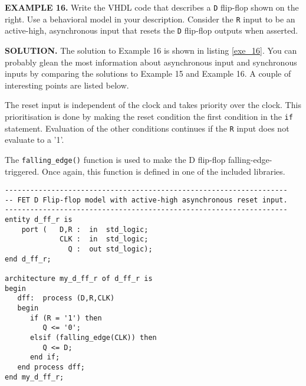 \begin{leftbar}
\begin{minipage}{0.5\linewidth}
\noindent
\textbf{EXAMPLE 16.}
Write the VHDL code that describes a \texttt{D} flip-flop shown on the right. Use a behavioral model in your description. Consider the \texttt{R} input to be an active-high, asynchronous input that resets the \texttt{D} flip-flop outputs when asserted.
\end{minipage}
\begin{minipage}{0.47\linewidth}
\begin{flushright}
\end{flushright}
\end{minipage}
\end{leftbar}
\noindent
\textbf{SOLUTION.} The solution to Example 16 is shown in listing \ref{exe_16}. You can probably glean the most information about asynchronous input and synchronous inputs by comparing the solutions to Example 15 and Example 16. A couple of interesting points are listed below. 
\begin{my_list}
\item The reset input is independent of the clock and takes priority over the clock. This prioritisation is done by making the reset condition the first condition in the \texttt{if} statement. Evaluation of the other conditions continues if the \texttt{R} input does not evaluate to a '1'.
\item The \texttt{falling\_edge()} function is used to make the D flip-flop falling-edge-triggered. Once again, this function is defined in one of the included libraries. 
\end{my_list}
\begin{lstlisting}[label=exe_16, caption=Solution to Example 16.]
-------------------------------------------------------------------
-- FET D Flip-flop model with active-high asynchronous reset input.
-------------------------------------------------------------------
entity d_ff_r is 
    port (   D,R :  in  std_logic; 
             CLK :  in  std_logic; 
               Q :  out std_logic); 
end d_ff_r;

architecture my_d_ff_r of d_ff_r is 
begin
   dff:  process (D,R,CLK)
   begin
      if (R = '1') then 
         Q <= '0'; 
      elsif (falling_edge(CLK)) then 
         Q <= D; 
      end if; 
   end process dff; 
end my_d_ff_r; 
\end{lstlisting}    
